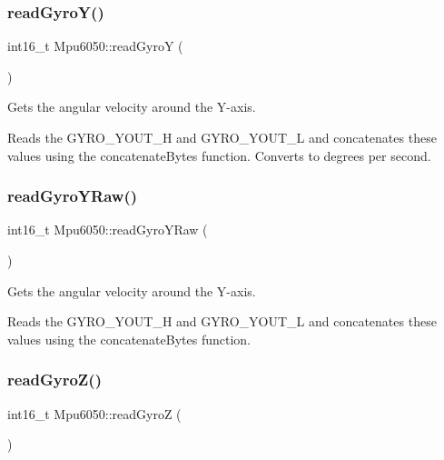 \subsubsection{\texorpdfstring{read\+Gyro\+Y()}{readGyroY()}}
{\footnotesize\ttfamily int16\+\_\+t Mpu6050\+::read\+GyroY (\begin{DoxyParamCaption}{ }\end{DoxyParamCaption})\hspace{0.3cm}{\ttfamily [virtual]}}



Gets the angular velocity around the Y-\/axis. 

Reads the G\+Y\+R\+O\+\_\+\+Y\+O\+U\+T\+\_\+H and G\+Y\+R\+O\+\_\+\+Y\+O\+U\+T\+\_\+L and concatenates these values using the concatenate\+Bytes function. Converts to degrees per second. \mbox{\label{classMpu6050_a080b7bea5ae0c8e839ee763aabb8a31c}} 
\subsubsection{\texorpdfstring{read\+Gyro\+Y\+Raw()}{readGyroYRaw()}}
{\footnotesize\ttfamily int16\+\_\+t Mpu6050\+::read\+Gyro\+Y\+Raw (\begin{DoxyParamCaption}{ }\end{DoxyParamCaption})\hspace{0.3cm}{\ttfamily [virtual]}}



Gets the angular velocity around the Y-\/axis. 

Reads the G\+Y\+R\+O\+\_\+\+Y\+O\+U\+T\+\_\+H and G\+Y\+R\+O\+\_\+\+Y\+O\+U\+T\+\_\+L and concatenates these values using the concatenate\+Bytes function. \mbox{\label{classMpu6050_ad9259b8dcbdf7f8e1473fc4b0d9273e4}} 
\subsubsection{\texorpdfstring{read\+Gyro\+Z()}{readGyroZ()}}
{\footnotesize\ttfamily int16\+\_\+t Mpu6050\+::read\+GyroZ (\begin{DoxyParamCaption}{ }\end{DoxyParamCaption})\hspace{0.3cm}{\ttfamily [virtual]}}



